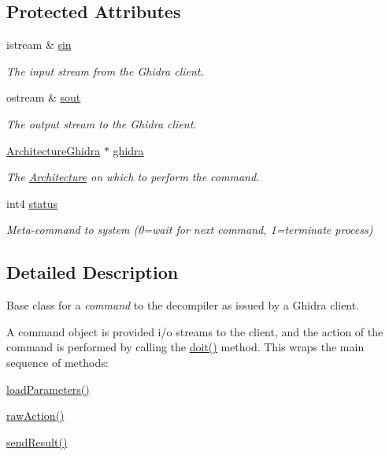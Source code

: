 \subsection*{Protected Attributes}
\begin{DoxyCompactItemize}
\item 
istream \& \mbox{\hyperlink{class_ghidra_command_af8206fa1ff96a669871717739f25a337}{sin}}
\begin{DoxyCompactList}\small\item\em The input stream from the Ghidra client. \end{DoxyCompactList}\item 
ostream \& \mbox{\hyperlink{class_ghidra_command_ad69e547a2a9f0f86f9a56679db28d615}{sout}}
\begin{DoxyCompactList}\small\item\em The output stream to the Ghidra client. \end{DoxyCompactList}\item 
\mbox{\hyperlink{class_architecture_ghidra}{Architecture\+Ghidra}} $\ast$ \mbox{\hyperlink{class_ghidra_command_ad5647427395bb496d4647f79f04a05aa}{ghidra}}
\begin{DoxyCompactList}\small\item\em The \mbox{\hyperlink{class_architecture}{Architecture}} on which to perform the command. \end{DoxyCompactList}\item 
int4 \mbox{\hyperlink{class_ghidra_command_a70cceb418d76ef01a922d3a01ccc76a6}{status}}
\begin{DoxyCompactList}\small\item\em Meta-\/command to system (0=wait for next command, 1=terminate process) \end{DoxyCompactList}\end{DoxyCompactItemize}


\subsection{Detailed Description}
Base class for a {\itshape command} to the decompiler as issued by a Ghidra client. 

A command object is provided i/o streams to the client, and the action of the command is performed by calling the \mbox{\hyperlink{class_ghidra_command_a60d65958413c0e4669768332fa0f0476}{doit()}} method. This wraps the main sequence of methods\+:
\begin{DoxyItemize}
\item \mbox{\hyperlink{class_ghidra_command_a3e92d63544a9e5a36f27f6c3b177b28a}{load\+Parameters()}}
\item \mbox{\hyperlink{class_ghidra_command_a7d1a5cfedfd8f1d05161d27627302716}{raw\+Action()}}
\item \mbox{\hyperlink{class_ghidra_command_a964ade9b1f768c55434d412834ba2eca}{send\+Result()}}
\end{DoxyItemize}

